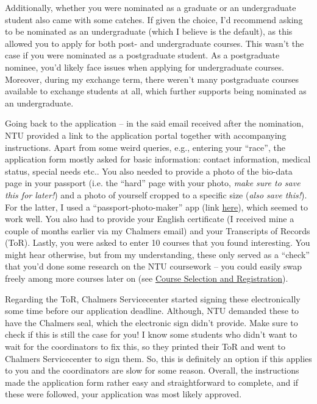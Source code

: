 Additionally, whether you were nominated as a graduate or an undergraduate student also came with some catches. If given the choice, I'd recommend asking to be nominated as an undergraduate (which I believe is the default), as this allowed you to apply for both post- and undergraduate courses. This wasn't the case if you were nominated as a postgraduate student. As a postgraduate nominee, you'd likely face issues when applying for undergraduate courses. Moreover, during my exchange term, there weren't many postgraduate courses available to exchange students at all, which further supports being nominated as an undergraduate.

Going back to the application -- in the said email received after the nomination, NTU provided a link to the application portal together with accompanying instructions. Apart from some weird queries, e.g., entering your ``race'', the application form mostly asked for basic information: contact information, medical status, special needs etc.. You also needed to provide a photo of the bio-data page in your passport (i.e. the ``hard'' page with your photo, \textit{make sure to save this for later!}) and a photo of yourself cropped to a specific size (\textit{also save this!}). For the latter, I used a ``passport-photo-maker'' app (link \href{https://www.google.com/url?sa=t&source=web&rct=j&opi=89978449&url=https://apps.apple.com/se/app/passport-size-photo-maker-app/id1615533705&ved=2ahUKEwjq7fmg14eKAxXlIRAIHYyYDKcQFnoECEIQAQ&usg=AOvVaw2MFZUfJ5qukJls3hL6DmwZ}{here}), which seemed to work well. You also had to provide your English certificate (I received mine a couple of months earlier via my Chalmers email) and your Transcripts of Records (ToR). Lastly, you were asked to enter 10 courses that you found interesting. You might hear otherwise, but from my understanding, these only served as a ``check'' that you'd done some research on the NTU coursework -- you could easily swap freely among more courses later on (see \hyperref[courses]{Course Selection and Registration}).

Regarding the ToR, Chalmers Servicecenter started signing these electronically some time before our application deadline. Although, NTU demanded these to have the Chalmers seal, which the electronic sign didn't provide. Make sure to check if this is still the case for you! I know some students who didn't want to wait for the coordinators to fix this, so they printed their ToR and went to Chalmers Servicecenter to sign them. So, this is definitely an option if this applies to you and the coordinators are slow for some reason. Overall, the instructions made the application form rather easy and straightforward to complete, and if these were followed, your application was most likely approved.
